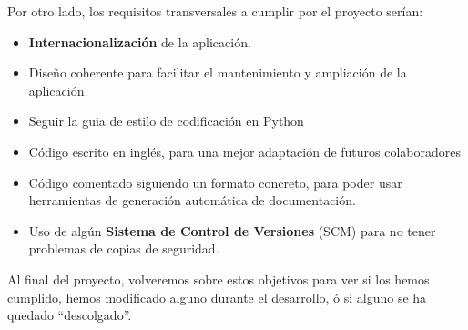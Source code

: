\noindent Por otro lado, los requisitos transversales a cumplir por el proyecto serían:

\begin{itemize}
\item \textbf{Internacionalización} de la aplicación.
\item Diseño coherente para facilitar el mantenimiento y ampliación de la aplicación.
\item Seguir la guia de estilo de codificación en Python \cite{web:pep8}
\item Código escrito en inglés, para una mejor adaptación de futuros colaboradores
\item Código comentado siguiendo un formato concreto, para poder usar herramientas de 
generación automática de documentación.
\item Uso de algún \textbf{Sistema de Control de Versiones} (SCM) para no tener problemas
de copias de seguridad.
\end{itemize}

Al final del proyecto, volveremos sobre estos objetivos para ver si los hemos cumplido,
hemos modificado alguno durante el desarrollo, ó si alguno se ha quedado ``descolgado''.
